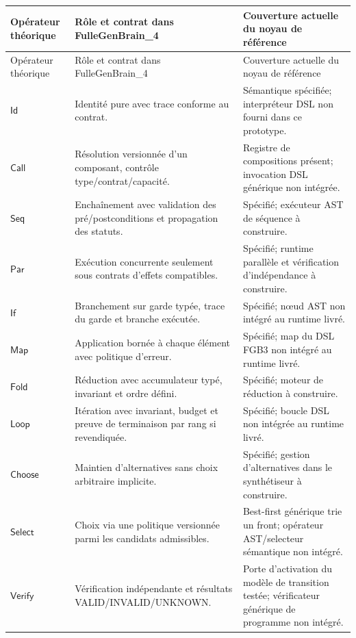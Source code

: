 \documentclass[11pt,a4paper]{article}
\begin{document}
\begin{longtable}{p{}p{}p{}}
\toprule Opérateur théorique & Rôle et contrat dans FulleGenBrain\_4 & Couverture actuelle du noyau de référence \\
\midrule
\endfirsthead
\toprule Opérateur théorique & Rôle et contrat dans FulleGenBrain\_4 & Couverture actuelle du noyau de référence \\
\midrule
\endhead
\(\mathsf{Id}\) & Identité pure avec trace conforme au contrat. & Sémantique spécifiée; interpréteur DSL non fourni dans ce prototype. \\
\(\mathsf{Call}\) & Résolution versionnée d'un composant, contrôle type/contrat/capacité. & Registre de compositions présent; invocation DSL générique non intégrée. \\
\(\mathsf{Seq}\) & Enchaînement avec validation des pré/postconditions et propagation des statuts. & Spécifié; exécuteur AST de séquence à construire. \\
\(\mathsf{Par}\) & Exécution concurrente seulement sous contrats d'effets compatibles. & Spécifié; runtime parallèle et vérification d'indépendance à construire. \\
\(\mathsf{If}\) & Branchement sur garde typée, trace du garde et branche exécutée. & Spécifié; nœud AST non intégré au runtime livré. \\
\(\mathsf{Map}\) & Application bornée à chaque élément avec politique d'erreur. & Spécifié; map du DSL FGB3 non intégré au runtime livré. \\
\(\mathsf{Fold}\) & Réduction avec accumulateur typé, invariant et ordre défini. & Spécifié; moteur de réduction à construire. \\
\(\mathsf{Loop}\) & Itération avec invariant, budget et preuve de terminaison par rang si revendiquée. & Spécifié; boucle DSL non intégrée au runtime livré. \\
\(\mathsf{Choose}\) & Maintien d'alternatives sans choix arbitraire implicite. & Spécifié; gestion d'alternatives dans le synthétiseur à construire. \\
\(\mathsf{Select}\) & Choix via une politique versionnée parmi les candidats admissibles. & Best-first générique trie un front; opérateur AST/selecteur sémantique non intégré. \\
\(\mathsf{Verify}\) & Vérification indépendante et résultats VALID/INVALID/UNKNOWN. & Porte d'activation du modèle de transition testée; vérificateur générique de programme non intégré. \\

\end{longtable}
\end{document}
